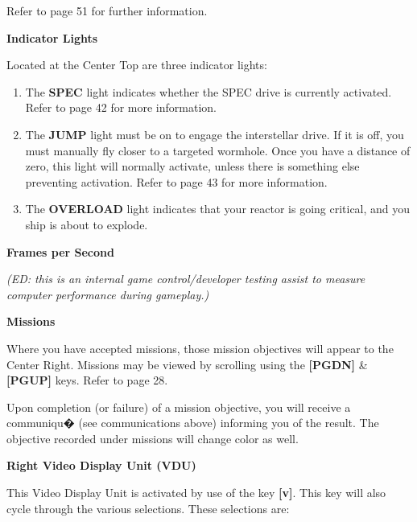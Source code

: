 \documentclass{article}
\begin{document}
Refer to page 51 for further information. 

\textbf{Indicator Lights }

Located at the Center Top are three indicator lights: 

\begin{enumerate}
\item  The \textbf{SPEC }light indicates whether the SPEC drive is currently activated. Refer to page 42 for more information. 

\item  The \textbf{JUMP }light must be on to engage the interstellar drive. If it is off, you must manually fly closer to a targeted wormhole. Once you have a distance of zero, this light will normally activate, unless there is something else preventing activation. Refer to page 43 for more information. 

\item  The \textbf{OVERLOAD} light indicates that your reactor is going critical, and you ship is about to explode. 
\end{enumerate}





\textbf{Frames per Second }

\textit{(ED: this is an internal game control/developer testing assist to measure computer performance during gameplay.) }

\textbf{Missions }

Where you have accepted missions, those mission objectives will appear to the Center Right. Missions may be viewed by scrolling using the \textbf{[PGDN] }\& \textbf{[PGUP] }keys. Refer to page 28. 

Upon completion (or failure) of a mission objective, you will receive a communiqu� (see communications above) informing you of the result. The objective recorded under missions will change color as well. 

\textbf{Right Video Display Unit (VDU) }

This Video Display Unit is activated by use of the key \textbf{[v]}. This key will also cycle through the various selections. These selections are: 
\end{document}
